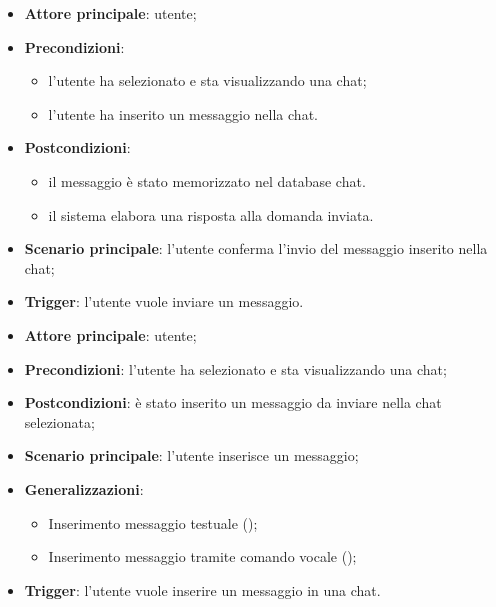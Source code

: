 \documentclass[10pt, a4paper]{article}
\begin{document}
    \begin{itemize}
        \item \textbf{Attore principale}: utente;
        \item \textbf{Precondizioni}: 
        \begin{itemize}
            \item l’utente ha selezionato e sta visualizzando una chat;
            \item l'utente ha inserito un messaggio nella chat.
        \end{itemize}
        \item \textbf{Postcondizioni}: 
            \begin{itemize}
                \item il messaggio è stato memorizzato nel database chat.
                \item il sistema elabora una risposta alla domanda inviata.
            \end{itemize}
        \item \textbf{Scenario principale}: l’utente conferma l'invio del messaggio inserito nella chat;
        \item \textbf{Trigger}: l’utente vuole inviare un messaggio.
    \end{itemize}
    

    \begin{itemize}
        \item \textbf{Attore principale}: utente;
        \item \textbf{Precondizioni}: l’utente ha selezionato e sta visualizzando una chat;
        \item \textbf{Postcondizioni}: è stato inserito un messaggio da inviare nella chat selezionata;
        \item \textbf{Scenario principale}: l’utente inserisce un messaggio;
        \item \textbf{Generalizzazioni}:
            \begin{itemize}
                \item Inserimento messaggio testuale ();
                \item Inserimento messaggio tramite comando vocale ();
            \end{itemize}
        \item \textbf{Trigger}: l’utente vuole inserire un messaggio in una chat.
    \end{itemize}
    
\end{document}

